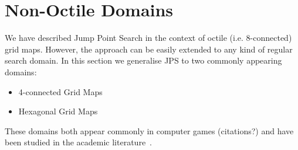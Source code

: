 \section{Non-Octile Domains}
We have described Jump Point Search in the context of octile (i.e. 8-connected) grid maps.
However, the approach can be easily extended to any kind of regular search domain.
In this section we generalise JPS to two commonly appearing domains:
\begin{itemize}
\item{4-connected Grid Maps}
\item{Hexagonal Grid Maps}
\end{itemize}

These domains both appear commonly in computer games (citations?) and have been
studied in the academic literature~\citep{yap02}.



